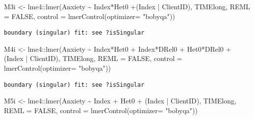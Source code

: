 \documentclass[
  11pt,
]{book}
\newenvironment{Shaded}{\begin{snugshade}}{\end{snugshade}}
\newcommand{\AttributeTok}[1]{\textcolor[rgb]{0.77,0.63,0.00}{#1}}
\newcommand{\ConstantTok}[1]{\textcolor[rgb]{0.00,0.00,0.00}{#1}}
\newcommand{\FunctionTok}[1]{\textcolor[rgb]{0.00,0.00,0.00}{#1}}
\newcommand{\NormalTok}[1]{#1}
\newcommand{\OtherTok}[1]{\textcolor[rgb]{0.56,0.35,0.01}{#1}}
\newcommand{\SpecialCharTok}[1]{\textcolor[rgb]{0.00,0.00,0.00}{#1}}
\newcommand{\StringTok}[1]{\textcolor[rgb]{0.31,0.60,0.02}{#1}}
\begin{document}
\begin{Shaded}
\begin{Highlighting}[]
\NormalTok{M3i }\OtherTok{\textless{}{-}}\NormalTok{ lme4}\SpecialCharTok{::}\FunctionTok{lmer}\NormalTok{(Anxiety }\SpecialCharTok{\textasciitilde{}}\NormalTok{ Index}\SpecialCharTok{*}\NormalTok{Het0 }\SpecialCharTok{+}\NormalTok{(Index }\SpecialCharTok{|}\NormalTok{ ClientID), TIMElong, }\AttributeTok{REML =} \ConstantTok{FALSE}\NormalTok{, }\AttributeTok{control =} \FunctionTok{lmerControl}\NormalTok{(}\AttributeTok{optimizer=} \StringTok{"bobyqa"}\NormalTok{))}
\end{Highlighting}
\end{Shaded}

\begin{verbatim}
boundary (singular) fit: see ?isSingular
\end{verbatim}

\begin{Shaded}
\begin{Highlighting}[]
\NormalTok{M4i }\OtherTok{\textless{}{-}}\NormalTok{ lme4}\SpecialCharTok{::}\FunctionTok{lmer}\NormalTok{(Anxiety }\SpecialCharTok{\textasciitilde{}}\NormalTok{ Index}\SpecialCharTok{*}\NormalTok{Het0 }\SpecialCharTok{+}\NormalTok{ Index}\SpecialCharTok{*}\NormalTok{DRel0 }\SpecialCharTok{+}\NormalTok{ Het0}\SpecialCharTok{*}\NormalTok{DRel0 }\SpecialCharTok{+}\NormalTok{ (Index }\SpecialCharTok{|}\NormalTok{ ClientID), TIMElong, }\AttributeTok{REML =} \ConstantTok{FALSE}\NormalTok{, }\AttributeTok{control =} \FunctionTok{lmerControl}\NormalTok{(}\AttributeTok{optimizer=} \StringTok{"bobyqa"}\NormalTok{))}
\end{Highlighting}
\end{Shaded}

\begin{verbatim}
boundary (singular) fit: see ?isSingular
\end{verbatim}

\begin{Shaded}
\begin{Highlighting}[]
\NormalTok{M5i }\OtherTok{\textless{}{-}}\NormalTok{ lme4}\SpecialCharTok{::}\FunctionTok{lmer}\NormalTok{(Anxiety }\SpecialCharTok{\textasciitilde{}}\NormalTok{ Index }\SpecialCharTok{+}\NormalTok{ Het0 }\SpecialCharTok{+}\NormalTok{ (Index }\SpecialCharTok{|}\NormalTok{ ClientID), TIMElong, }\AttributeTok{REML =} \ConstantTok{FALSE}\NormalTok{, }\AttributeTok{control =} \FunctionTok{lmerControl}\NormalTok{(}\AttributeTok{optimizer=} \StringTok{"bobyqa"}\NormalTok{))}
\end{Highlighting}
\end{Shaded}
\end{document}
